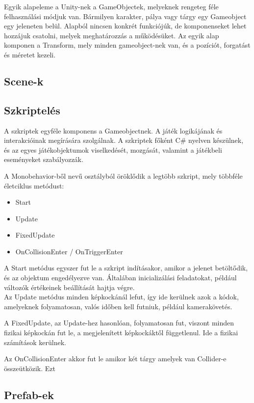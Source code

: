 \documentclass[
]{thesis-ekf}
\theoremstyle{definition}
\theoremstyle{remark}
\begin{document}
Egyik alapeleme a Unity-nek a GameObjectek, melyeknek rengeteg féle felhasználási módjuk van. Bármilyen karakter, pálya vagy tárgy egy Gameobject egy jeleneten belül.
Alapból nincsen konkrét funkciójúk, de komponenseket lehet hozzájuk csatolni, melyek meghatározzás a működésüket. Az egyik alap komponen a Transform, mely minden gameobject-nek van, és a pozíciót, forgatást és méretet kezeli.



\subsection{Scene-k}


\subsection{Szkriptelés}

A szkriptek egyféle komponens a Gameobjectnek. A játék logikájának és interakcióinak megírására szolgálnak. A szkriptek főként C\# nyelven készülnek, és az egyes játékobjektumok viselkedését, mozgását, valamint a játékbeli eseményeket szabályozzák.


A Monobehavior-ből nevű osztályból öröklődik a legtöbb szkript, mely többféle életciklus metódust:

\begin{itemize}
    \item Start
    \item Update
    \item FixedUpdate
    \item OnCollisionEnter / OnTriggerEnter
\end{itemize}

A Start metódus egyszer fut le a szkript indításakor, amikor a jelenet betöltődik, és az objektum engedélyezve van. Általában inicializálási feladatokat, például változók értékeinek beállítását hajtja végre.
\\
Az Update metódus minden képkockánál lefut, így ide kerülnek azok a kódok, amelyeknek folyamatosan, valós időben kell futniuk, például kamerakövetés.

A FixedUpdate, az Update-hez hasonlóan, folyamatosan fut, viszont minden fizikai képkockán fut le, a megjelenített képkockáktől függetlenul. Ide a fizikai számítások kerülnek.

Az OnCollisionEnter akkor fut le amikor két tárgy amelyek van Collider-e összeütközik. Ezt

\subsection{Prefab-ek}
\end{document}
